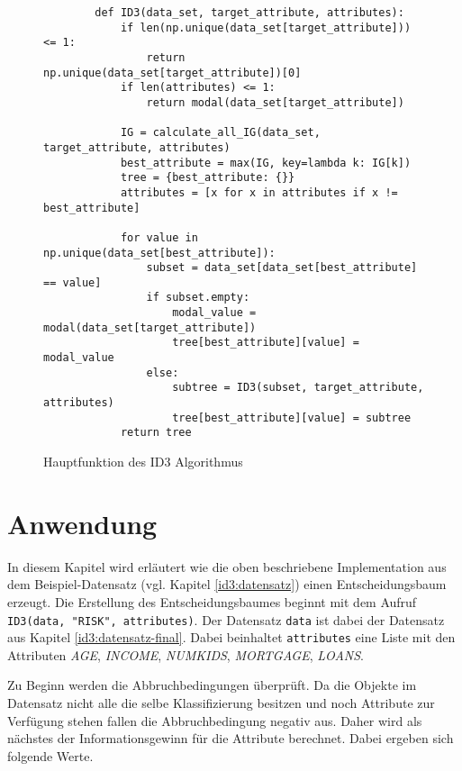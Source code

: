 \begin{figure}[htbp]
    \centering
    \begin{verbatim}
        def ID3(data_set, target_attribute, attributes):
            if len(np.unique(data_set[target_attribute])) <= 1:
                return np.unique(data_set[target_attribute])[0]
            if len(attributes) <= 1:       
                return modal(data_set[target_attribute])

            IG = calculate_all_IG(data_set, target_attribute, attributes)
            best_attribute = max(IG, key=lambda k: IG[k])
            tree = {best_attribute: {}}
            attributes = [x for x in attributes if x != best_attribute]

            for value in np.unique(data_set[best_attribute]):
                subset = data_set[data_set[best_attribute] == value]
                if subset.empty:
                    modal_value = modal(data_set[target_attribute])
                    tree[best_attribute][value] = modal_value
                else:
                    subtree = ID3(subset, target_attribute, attributes)
                    tree[best_attribute][value] = subtree
            return tree
    \end{verbatim}
    \caption{Hauptfunktion des ID3 Algorithmus \autocites{MaxKeyByValue:online}{ID3algor15:online}{PythonCourseDecisionTrees:online}}
\end{figure}


\section{Anwendung}
\label{id3:anwendung}
In diesem Kapitel wird erläutert wie die oben beschriebene Implementation aus dem Beispiel-Datensatz (vgl. Kapitel \ref{id3:datensatz}) einen Entscheidungsbaum erzeugt. Die Erstellung des Entscheidungsbaumes beginnt mit dem Aufruf \texttt{ID3(data, "RISK", attributes)}. Der Datensatz \texttt{data} ist dabei der Datensatz aus Kapitel \ref{id3:datensatz-final}. Dabei beinhaltet \texttt{attributes} eine Liste mit den Attributen \textit{AGE}, \textit{INCOME}, \textit{NUMKIDS}, \textit{MORTGAGE}, \textit{LOANS}.

Zu Beginn werden die Abbruchbedingungen überprüft. Da die Objekte im Datensatz nicht alle die selbe Klassifizierung besitzen und noch Attribute zur Verfügung stehen fallen die Abbruchbedingung negativ aus. Daher wird als nächstes der Informationsgewinn für die Attribute berechnet. Dabei ergeben sich folgende Werte.

